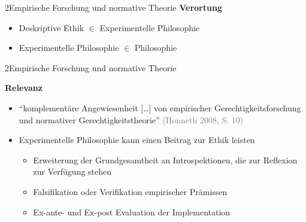 \documentclass[xcolor=table,9pt,aspectratio=169]{beamer}
\begin{document}
\begin{frame}{\vspace*{10mm}2\hspace*{1em}Empirische Forschung und normative Theorie}
\textbf{Verortung}\\
\medskip
\begin{itemize}
   \item Deskriptive Ethik $\in$ Experimentelle Philosophie
   \item Experimentelle Philosophie $\in$ Philosophie
\end{itemize}
\end{frame}


\begin{frame}{\vspace*{10mm}2\hspace*{1em}Empirische Forschung und normative Theorie}
\begin{multicols}{2}
   \textbf{Relevanz}\\
   \medskip
   \begin{itemize}
      \item \enquote{komplementäre Angewiesenheit [\ldots] von empirischer Gerechtigkeitsforschung und normativer Gerechtigkeitstheorie} \textcolor{gray}{(Honneth 2008, S. 10)}
      \item Experimentelle Philosophie kann einen Beitrag zur Ethik leisten
      \begin{itemize}
         \item Erweiterung der Grundgesamtheit an Introspektionen, die zur Reflexion zur Verfügung stehen
         \item Falsifikation oder Verifikation empirischer Pr\"amissen
         \item Ex-ante- und Ex-post Evaluation der Implementation
      \end{itemize}
   \end{itemize}
   \vfill
   \begin{center}
      \\

\end{center}
\end{multicols}
\end{frame}
\end{document}
